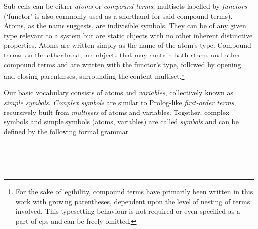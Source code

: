 Sub-cells can be either \emph{atoms} or \emph{compound terms}, multisets labelled by \emph{functors} (`functor' is also commonly used as a shorthand for said compound terms).  Atoms, as the name suggests, are indivisible symbols.  They can be of any given type relevant to a system but are static objects with no other inherent distinctive properties.  Atoms are written simply as the name of the atom's type.  Compound terms, on the other hand, are objects that may contain both atoms and other compound terms and are written with the functor's type, followed by opening and closing parentheses, surrounding the content multiset.\footnote{For the sake of legibility, compound terms have primarily been written in this work with growing parentheses, dependent upon the level of nesting of terms involved.  This typesetting behaviour is not required or even specified as a part of \gls{cps} and can be freely omitted.}

Our basic vocabulary consists of atoms and \emph{variables}, collectively known as \emph{simple symbols}.  \emph{Complex symbols} are similar to Prolog-like \emph{first-order terms}, recursively built from \emph{multisets} of atoms and variables.  Together, complex symbols and simple symbols (atoms, variables) are called \emph{symbols} and can be defined by the following formal grammar:


\begin{framed}
\vspace{-0.9cm}
\begin{small}
\begin{bnf*}
    \\
    \\
    \\
\end{bnf*}
\end{small}
\vspace{-1.0cm}
\end{framed}

